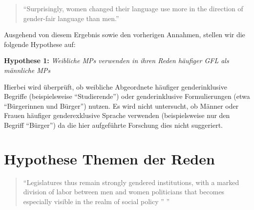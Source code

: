 \documentclass[12pt, 
    twoside=false, 
    bibliography=totoc, 
    numbers=endperiod, 
    headings=normal, 
    toc=chapterentrydotfill
    ]{scrbook}
\begin{document}
\citereset
\begin{quote}
    \enquote {Surprisingly, women changed their language use more in the direction of gender-fair language than men.} \parencite[555]{koeser_2014}
\end{quote}


Ausgehend von diesem Ergebnis sowie den vorherigen Annahmen, stellen wir die folgende Hypothese auf: 

\textbf{Hypothese 1:} \emph{Weibliche MPs verwenden in ihren Reden häufiger GFL als männliche MPs}

Hierbei wird überprüft, ob weibliche Abgeordnete häufiger genderinklusive Begriffe (beispielsweise \enquote{Studierende}) oder genderinklusive Formulierungen (etwa \enquote{Bürgerinnen und Bürger}) nutzen. Es wird nicht untersucht, ob Männer oder Frauen häufiger genderexklusive Sprache verwenden (beispielsweise nur den Begriff \enquote{Bürger}) da die hier aufgeführte Forschung dies nicht suggeriert. 

\section{Hypothese Themen der Reden}\label{kapitel:hypothese2}

\begin{quote}
    \enquote{Legislatures thus remain strongly gendered institutions, with a marked division of labor between men and women politicians that becomes especially visible in the realm of social policy ” \parencite[250]{ennser-jedenastik_2017}}
\end{quote}
\end{document}
